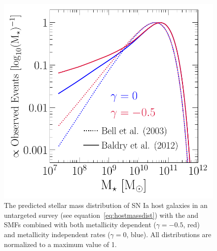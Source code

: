 \documentclass[ms.tex]{subfiles}
\begin{document}
\begin{figure}
\centering
\includegraphics[scale = 0.55]{ia_massdist.pdf}
\caption{
The predicted stellar mass distribution of SN Ia host galaxies in an
untargeted survey (see equation~\ref{eq:hostmassdist}) with the
\citet[][dotted]{Bell2003} and~\citet[][solid]{Baldry2012} SMFs combined with
both metallicity dependent ($\gamma = -0.5$, red) and metallicity independent
rates ($\gamma = 0$, blue).
All distributions are normalized to a maximum value of 1.
}
\label{fig:hostmassdist}
\end{figure}
\end{document}
